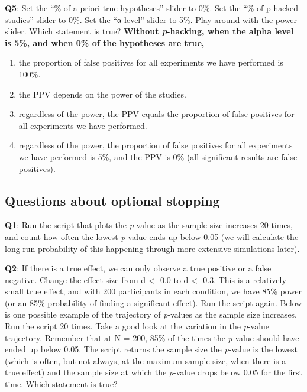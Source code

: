 \documentclass[
]{krantz}
\providecommand{\tightlist}{%
  \setlength{\itemsep}{0pt}\setlength{\parskip}{0pt}}
\begin{document}
\textbf{Q5}: Set the ``\% of a priori true hypotheses'' slider to 0\%. Set the ``\% of p-hacked studies'' slider to 0\%. Set the ``α level'' slider to 5\%. Play around with the power slider. Which statement is true?
\textbf{Without \emph{p}-hacking, when the alpha level is 5\%, and when 0\% of the hypotheses are true, }

\begin{enumerate}
\def\labelenumi{\Alph{enumi})}
\tightlist
\item
  the proportion of false positives for all experiments we have performed is 100\%.
\item
  the PPV depends on the power of the studies.
\item
  regardless of the power, the PPV equals the proportion of false positives for all experiments we have performed.
\item
  regardless of the power, the proportion of false positives for all experiments we have performed is 5\%, and the PPV is 0\% (all significant results are false positives).
\end{enumerate}

\hypertarget{questions-about-optional-stopping}{%
\subsection{Questions about optional stopping}\label{questions-about-optional-stopping}}

\textbf{Q1}: Run the script that plots the \emph{p}-value as the sample size increases 20 times, and count how often the lowest \emph{p}-value ends up below 0.05 (we will calculate the long run probability of this happening through more extensive simulations later).

\textbf{Q2}: If there is a true effect, we can only observe a true positive or a false negative. Change the effect size from d \textless- 0.0 to d \textless- 0.3. This is a relatively small true effect, and with 200 participants in each condition, we have 85\% power (or an 85\% probability of finding a significant effect). Run the script again. Below is one possible example of the trajectory of \emph{p}-values as the sample size increases. Run the script 20 times. Take a good look at the variation in the \emph{p}-value trajectory. Remember that at N = 200, 85\% of the times the \emph{p}-value should have ended up below 0.05. The script returns the sample size the \emph{p}-value is the lowest (which is often, but not always, at the maximum sample size, when there is a true effect) and the sample size at which the \emph{p}-value drops below 0.05 for the first time. Which statement is true?
\end{document}
